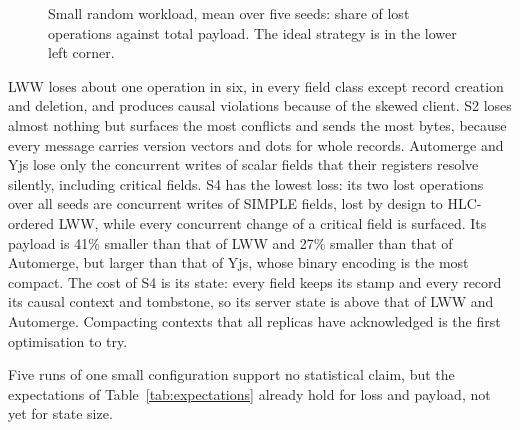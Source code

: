 \begin{figure}[ht]
\centering
{}
\caption{Small random workload, mean over five seeds: share of lost operations against total payload. The ideal
strategy is in the lower left corner.}
\label{fig:random}
\end{figure}

LWW loses about one operation in six, in every field
class except record creation and deletion, and produces causal violations because of the skewed client. S2 loses almost nothing but surfaces the most
conflicts and sends the most bytes, because every message carries version vectors and dots for whole records.
Automerge and Yjs lose only the concurrent writes of scalar fields that their registers resolve silently, including
critical fields. S4 has the lowest loss: its two lost operations over all seeds are concurrent writes of SIMPLE fields,
lost by design to HLC-ordered LWW, while every concurrent change of a critical field is surfaced. Its payload is 41\%
smaller than that of LWW and 27\% smaller than that of Automerge, but larger than that of Yjs, whose binary encoding is
the most compact. The cost of S4 is its state: every field keeps its stamp and every record its causal context and
tombstone, so its server state is above that of LWW and Automerge. Compacting contexts that all replicas have
acknowledged is the first optimisation to try.

Five runs of one small configuration support no statistical claim, but the expectations of
Table~\ref{tab:expectations} already hold for loss and payload, not yet for state size.
